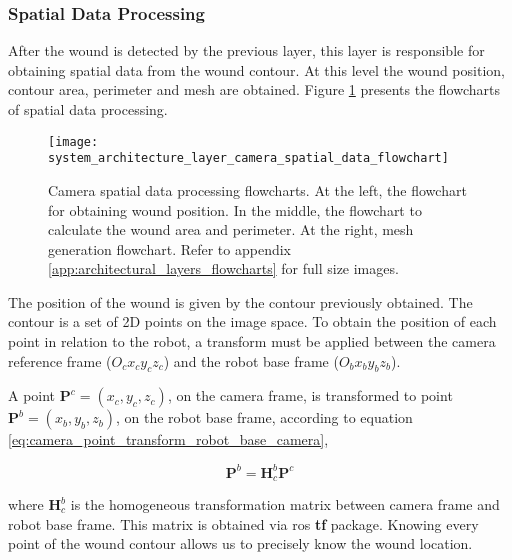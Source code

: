 
\subsubsection*{Spatial Data Processing}
\label{subsubsec:system_architectural_camera_layers_spatial_data}

After the wound is detected by the previous layer, this layer is responsible for obtaining spatial data from the wound contour. At this level the wound position, contour area, perimeter and mesh are obtained. Figure \ref{fig:system_architecture_layer_camera_spatial_data_flowchart} presents the flowcharts of spatial data processing.

\begin{figure}[htbp]
	\centering
	\texttt{[image: system\_architecture\_layer\_camera\_spatial\_data\_flowchart]}
	\caption[Camera spatial data processing flowcharts.]{Camera spatial data processing flowcharts. At the left, the flowchart for obtaining wound position. In the middle, the flowchart to calculate the wound area and perimeter. At the right, mesh generation flowchart. Refer to appendix \ref{app:architectural_layers_flowcharts} for full size images.}
	\label{fig:system_architecture_layer_camera_spatial_data_flowchart}
\end{figure}

The position of the wound is given by the contour previously obtained. The contour is a set of 2D points on the image space. To obtain the position of each point in relation to the robot, a transform must be applied between the camera reference frame ($O_cx_cy_cz_c$) and the robot base frame ($O_bx_by_bz_b$).

A point $\boldsymbol{P}^c = (x_c, y_c, z_c)$, on the camera frame, is transformed to point $\boldsymbol{P}^b = (x_b, y_b, z_b)$, on the robot base frame, according to equation \ref{eq:camera_point_transform_robot_base_camera},

\begin{equation}
\boldsymbol{P}^b = \boldsymbol{H}^b_c \boldsymbol{P}^c
\label{eq:camera_point_transform_robot_base_camera}
\end{equation}

where $\boldsymbol{H}^b_c$ is the homogeneous transformation matrix between camera frame and robot base frame. This matrix is obtained via \gls{ros} \textbf{tf} package. Knowing every point of the wound contour allows us to precisely know the wound location.

